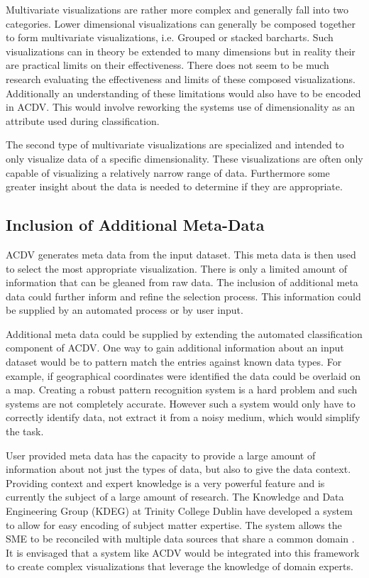 \documentclass[a4paper, 11pt, titlepage, onehalfspacing]{report}
\begin{document}
Multivariate visualizations are rather more complex and generally fall into two categories. Lower dimensional visualizations can generally be composed together to form multivariate visualizations, i.e. Grouped or stacked barcharts. Such visualizations can in theory be extended to many dimensions but in reality their are practical limits on their effectiveness. There does not seem to be much research evaluating the effectiveness and limits of these composed visualizations. Additionally an understanding of these limitations would also have to be encoded in AC\lightning{}DV. This would involve reworking the systems use of dimensionality as an attribute used during classification.

The second type of multivariate visualizations are specialized and intended to only visualize data of a specific dimensionality. These visualizations are often only capable of visualizing a relatively narrow range of data. Furthermore some greater insight about the data is needed to determine if they are appropriate.

\subsection{Inclusion of Additional Meta-Data}
AC\lightning{}DV generates meta data from the input dataset. This meta data is then used to select the most appropriate visualization. There is only a limited amount of information that can be gleaned from raw data. The inclusion of additional meta data could further inform and refine the selection process. This information could be supplied by an automated process or by user input.

Additional meta data could be supplied by extending the automated classification component of AC\lightning{}DV. One way to gain additional information about an input dataset would be to pattern match the entries against known data types. For example, if geographical coordinates were identified the data could be overlaid on a map. Creating a robust pattern recognition system is a hard problem and such systems are not completely accurate. However such a system would only have to correctly identify data, not extract it from a noisy medium, which would simplify the task.

User provided meta data has the capacity to provide a large amount of information about not just the types of data, but also to give the data context. Providing context and expert knowledge is a very powerful feature and is currently the subject of a large amount of research. The Knowledge and Data Engineering Group (KDEG) at Trinity College Dublin have developed a system to allow for easy encoding of subject matter expertise. The system allows the SME to be reconciled with multiple data sources that share a common domain \cite{champ}. It is envisaged that a system like AC\lightning{}DV would be integrated into this framework to create complex visualizations that leverage the knowledge of domain experts.
\end{document}
